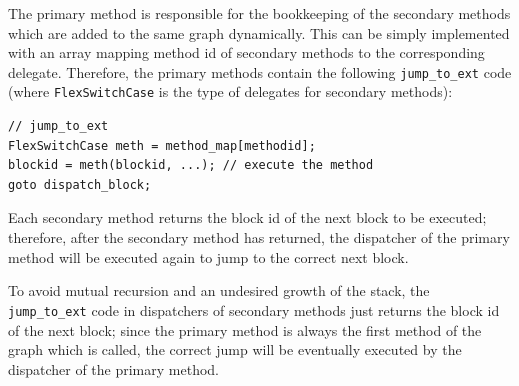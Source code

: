 The primary method is responsible for the bookkeeping of the secondary
methods which are added to the same graph dynamically. This can be 
simply implemented with an array mapping method id of secondary methods
to the corresponding delegate. Therefore, the primary methods contain
the following \lstinline{jump_to_ext} code (where
\lstinline{FlexSwitchCase} is the type of delegates for secondary methods):
\begin{small}
\begin{lstlisting}[language={[Sharp]C}] 
// jump_to_ext
FlexSwitchCase meth = method_map[methodid];
blockid = meth(blockid, ...); // execute the method
goto dispatch_block;
\end{lstlisting}
\end{small}
Each secondary method returns the block id of the next block to be
executed; therefore, after the secondary method has returned, the
dispatcher of the primary method will be executed again to jump
to the correct next block. 

To avoid mutual recursion and an undesired growth of the stack,
the \lstinline{jump_to_ext} code in dispatchers of secondary methods
just returns the block id of the next block; since the primary method
is always the first method of the graph which is called, the correct
jump will be eventually executed by the dispatcher of the primary method.

